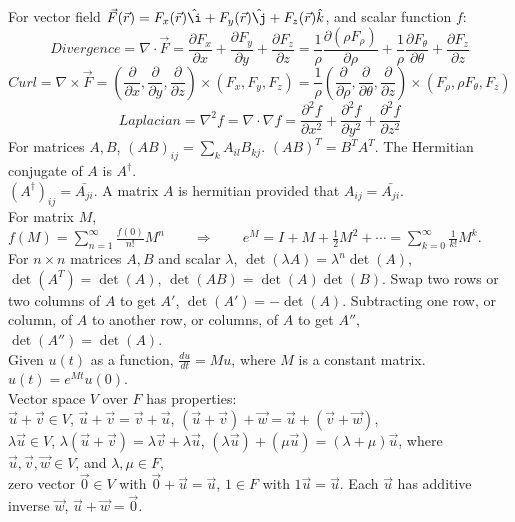 \documentclass[11pt]{article}
\theoremstyle{break}
\theoremstyle{break}
\newcommand{\pd}{\partial}
\newcommand{\ihat}{\hat{\i}}
\newcommand{\jhat}{\hat{\j}}
\newcommand{\khat}{\hat{k}}
\begin{document}
For vector field $\vec{F} (\vec{r}) = F_x(\vec{r})\ihat+ F_y(\vec{r})\jhat + F_z(\vec{r})\khat$, and scalar function $f$:
$$Divergence = \nabla \cdot \vec{F} = \frac{\pd F_x}{\pd x} + \frac{\pd F_y}{\pd y }+ \frac{\pd F_z}{\pd z} = \frac{1}{\rho}\frac{\pd(\rho F_{\rho})}{\pd \rho} + \frac{1}{\rho}\frac{\pd F_\theta}{\pd \theta} + \frac{\pd F_z}{\pd z}$$
$$Curl = \nabla \times \vec{F} = (\frac{\pd}{\pd x}, \frac{\pd}{\pd y}, \frac{\pd}{\pd z})\times (F_x,F_y,F_z) = \frac{1}{\rho}(\frac{\pd}{\pd \rho}, \frac{\pd}{\pd \theta}, \frac{\pd }{\pd z})\times (F_\rho, \rho F_\theta, F_z)$$
$$Laplacian = \nabla^2 f = \nabla \cdot \nabla f = \frac{\pd^2 f}{\pd x^2} + \frac{\pd^2 f}{\pd y^2} + \frac{\pd^2 f}{\pd z^2}$$
\hfill\break
For matrices $A, B$, $(AB)_{ij} = \sum_{k} A_{il} B_{kj}$. $(AB)^T = B^T A^T$. The Hermitian conjugate of $A$ is $A^\dagger$. \\ $(A^\dagger)_{ij} = \bar{A_{ji}}$. A matrix $A$ is hermitian provided that $A_{ij} = \bar{A_{ji}}$. \\

For matrix $M$, $f(M) = \sum_{n=1}^\infty \frac{f(0)}{n!} M^n \qquad \Rightarrow \qquad e^M = I + M + \frac{1}{2}M^2+ \cdots =\sum_{k=0}^\infty \frac{1}{k!}M^k$.\\

For $n \times n$ matrices $A, B$ and scalar $\lambda$, $\det(\lambda A) = \lambda^n \det(A)$, $\det(A^T) = \det(A)$, $\det(AB) = \det(A)\det(B)$. Swap two rows or two columns of $A$ to get $A'$, $\det(A') = -\det(A)$. Subtracting one row, or column, of $A$ to another row, or columns, of $A$ to get $A''$, $\det(A'') = \det(A)$. \\

Given $u(t)$ as a function, $\frac{du}{dt} = M u$, where $M$ is a constant matrix. $u(t) = e^{Mt}u(0)$. \\

Vector space $V$ over $F$ has properties: \\$\vec{u}+\vec{v}\in V$, $\vec{u}+\vec{v} = \vec{v}+\vec{u}$, $(\vec{u}+\vec{v}) +\vec{w} = \vec{u}+(\vec{v}+\vec{w})$, \\$\lambda \vec{u} \in V$, $\lambda(\vec{u}+\vec{v}) = \lambda\vec{v}+\lambda\vec{u}$, $(\lambda\vec{u})+(\mu \vec{u}) = (\lambda+\mu)\vec{u}$, where $\vec{u},\vec{v},\vec{w}\in V$, and $\lambda,\mu \in F$, \\
zero vector $\vec{0}\in V$ with $\vec{0}+\vec{u} = \vec{u}$, $1 \in F$ with $1\vec{u} = \vec{u}$. Each $\vec{u}$ has additive inverse $\vec{w}$, $\vec{u}+\vec{w} = \vec{0}$. \\
\end{document}
